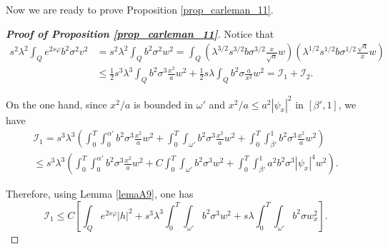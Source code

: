 \documentclass[11pt,oneside,a4papper]{osajnl}
\begin{document}
\noindent Now we are ready to prove Proposition \ref{prop_carleman_11}.

\begin{proof}[\bf Proof of Proposition \ref{prop_carleman_11}]
    Notice that
    \begin{align*}
        s^2\lambda^2\int_Qe^{2s\varphi}b^2\sigma^2v^2 &= s^2\lambda^2\int_Qb^2\sigma^2w^2 = \int_{Q}\left(\lambda^{3/2}s^{3/2}b\sigma^{3/2}\frac{x}{\sqrt{a}}w\right)\left( \lambda^{1/2}s^{1/2}b\sigma^{1/2}\frac{\sqrt{a}}{x}w \right) \\
        &\leq \frac{1}{2}s^3\lambda^3\int_{Q}b^2\sigma^3\frac{x^2}{a}w^2+\frac{1}{2}s\lambda\int_Qb^2\sigma \frac{a}{x^2}w^2=\mathcal{I}_1+\mathcal{I}_2.
    \end{align*}

    On the one hand, since $x^2/a$ is bounded in $\omega'$ and $x^2/a\leq a^2|\psi_x|^2$ in $[\beta',1]$, we have
    \begin{align*}
        \mathcal{I}_1= s^3\lambda^3 \left( \int_0^T \int_0^{\alpha'} b^2\sigma^3\frac{x^2}{a}w^2 +  \int_0^T\int_{\omega'} b^2\sigma^3\frac{x^2}{a}w^2 + \int_0^T \int_{\beta'}^1b^2\sigma^3\frac{x^2}{a}w^2 \right) \\
        \leq s^3\lambda^3 \left( \int_0^T \int_0^{\alpha'} b^2\sigma^3\frac{x^2}{a}w^2 + C \int_0^T\int_{\omega'} b^2\sigma^3w^2 + \int_0^T \int_{\beta'}^1a^2b^2\sigma^3|\psi_x|^4w^2 \right).
    \end{align*}

    
    Therefore, using Lemma \ref{lemaA9}, one has
    $$\mathcal{I}_1\leq C\left[ \int_Q e^{2s\varphi} |h|^2 + s^3\lambda^3 \int_0^T \int_{\omega'} b^2\sigma^3 w^2 + s\lambda \int_0^T \int_{\omega'} b^2\sigma w_x^2  \right].$$
    

\end{proof}
\end{document}
